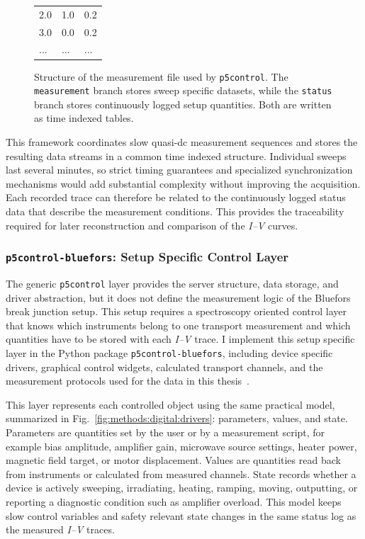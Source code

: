 \begin{figure}[t]
{\begin{tabular}{l|ll}
                    2.0 & 1.0 & 0.2\\
                    3.0 & 0.0 & 0.2\\
                    ... & ... & ...\\
                \end{tabular}
                }
                \caption{Structure of the measurement file used by \texttt{p5control}. The \texttt{measurement} branch stores sweep specific datasets, while the \texttt{status} branch stores continuously logged setup quantities. Both are written as time indexed tables.}
                \label{fig:methods:digital:datatree}            
            \end{figure}

            This framework coordinates slow quasi-dc measurement sequences and stores the resulting data streams in a common time indexed structure. Individual sweeps last several minutes, so strict timing guarantees and specialized synchronization mechanisms would add substantial complexity without improving the acquisition. Each recorded trace can therefore be related to the continuously logged status data that describe the measurement conditions. This provides the traceability required for later reconstruction and comparison of the \textit{I--V} curves.

        \subsubsection*{\texttt{p5control-bluefors}: Setup Specific Control Layer}

            The generic \texttt{p5control} layer provides the server structure, data storage, and driver abstraction, but it does not define the measurement logic of the Bluefors break junction setup. This setup requires a spectroscopy oriented control layer that knows which instruments belong to one transport measurement and which quantities have to be stored with each \textit{I--V} trace. I implement this setup specific layer in the Python package \texttt{p5control-bluefors}, including device specific drivers, graphical control widgets, calculated transport channels, and the measurement protocols used for the data in this thesis~\cite{kayatz_p5control_bluefors}.

            This layer represents each controlled object using the same practical model, summarized in Fig.~\ref{fig:methods:digital:drivers}: parameters, values, and state. Parameters are quantities set by the user or by a measurement script, for example bias amplitude, amplifier gain, microwave source settings, heater power, magnetic field target, or motor displacement. Values are quantities read back from instruments or calculated from measured channels. State records whether a device is actively sweeping, irradiating, heating, ramping, moving, outputting, or reporting a diagnostic condition such as amplifier overload. This model keeps slow control variables and safety relevant state changes in the same status log as the measured \textit{I--V} traces.

